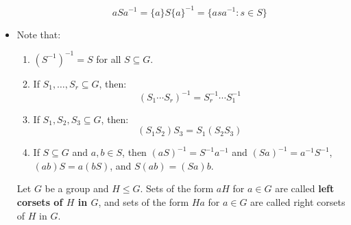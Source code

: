 \begin{itemize}
\begin{enumerate}
\begin{equation}
            aSa^{-1} = \{a\}S\{a\}^{-1} = \{asa^{-1}:s\in S\}
        \end{equation}
    \end{enumerate}
    \item Note that:
    \begin{enumerate}
        \item $(S^{-1})^{-1}=S$ for all $S \subseteq G$.
        \item If $S_1,\dots,S_r \subseteq G$, then:
        \begin{equation}
            (S_1\cdots S_r)^{-1} = S_r^{-1}\cdots S_1^{-1}
        \end{equation}
        \item If $S_1,S_2,S_3 \subseteq G$, then:
        \begin{equation}
            (S_1S_2)S_3 = S_1(S_2S_3)
        \end{equation}
        \item If $S \subseteq G$ and $a,b \in S$, then $(aS)^{-1}=S^{-1}a^{-1}$ and $(Sa)^{-1}=a^{-1}S^{-1}$, $(ab)S=a(bS)$, and $S(ab)=(Sa)b$.
    \end{enumerate}
    \begin{definition}
        Let $G$ be a group and $H\le G$. Sets of the form $aH$ for $a\in G$ are called \textbf{left corsets of $H$ in $G$}, and sets of the form $Ha$ for $a\in G$ are called right corsets of $H$ in $G$.
        

\end{definition}
\end{itemize}
